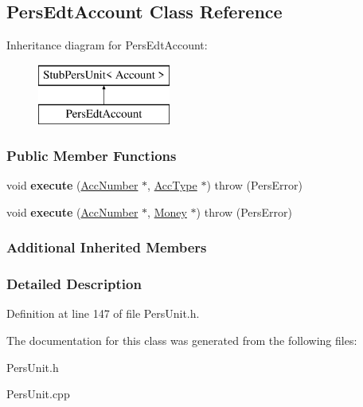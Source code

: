 \hypertarget{classPersEdtAccount}{\subsection{Pers\-Edt\-Account Class Reference}
\label{d9/d3d/classPersEdtAccount}
}
Inheritance diagram for Pers\-Edt\-Account\-:\begin{figure}[H]
\begin{center}
\leavevmode
\includegraphics[height=2.000000cm]{d9/d3d/classPersEdtAccount}
\end{center}
\end{figure}
\subsubsection*{Public Member Functions}
\begin{DoxyCompactItemize}
\item 
\hypertarget{classPersEdtAccount_ad6ee8ffd77bd4e6e169c2cc1aca39619}{void {\bfseries execute} (\hyperlink{classAccNumber}{Acc\-Number} $\ast$, \hyperlink{classUsrType}{Acc\-Type} $\ast$)  throw (\-Pers\-Error)}\label{d9/d3d/classPersEdtAccount_ad6ee8ffd77bd4e6e169c2cc1aca39619}

\item 
\hypertarget{classPersEdtAccount_aacdc72e8ee1842be9516d0a17c043460}{void {\bfseries execute} (\hyperlink{classAccNumber}{Acc\-Number} $\ast$, \hyperlink{classMoney}{Money} $\ast$)  throw (\-Pers\-Error)}\label{d9/d3d/classPersEdtAccount_aacdc72e8ee1842be9516d0a17c043460}

\end{DoxyCompactItemize}
\subsubsection*{Additional Inherited Members}


\subsubsection{Detailed Description}


Definition at line 147 of file Pers\-Unit.\-h.



The documentation for this class was generated from the following files\-:\begin{DoxyCompactItemize}
\item 
Pers\-Unit.\-h\item 
Pers\-Unit.\-cpp\end{DoxyCompactItemize}
